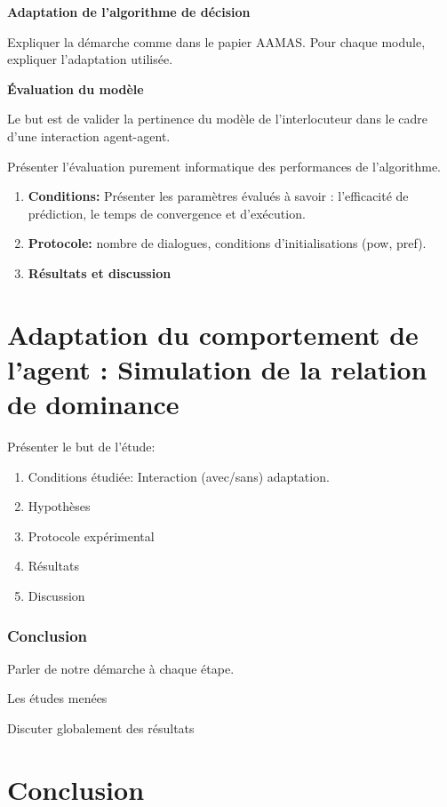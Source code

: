 \documentclass [french]{article}
\begin{document}
		\textbf{Adaptation de l'algorithme de décision}
		
			\par Expliquer la démarche comme dans le papier AAMAS. Pour chaque module, expliquer l'adaptation utilisée.
			
		\textbf{Évaluation du modèle}
		
			Le but est de valider la pertinence du modèle de l'interlocuteur dans le cadre d'une interaction agent-agent. 
			\par Présenter l'évaluation purement informatique des performances de l'algorithme.
			\begin{enumerate}
					\item \textbf{Conditions:} Présenter les paramètres évalués à savoir : l'efficacité de prédiction, le temps de convergence et d'exécution.
					\item \textbf{Protocole:} nombre de dialogues, conditions d'initialisations (pow, pref).
					\item \textbf{Résultats et discussion}
			\end{enumerate}
	
	\section{Adaptation du comportement de l'agent : Simulation de la relation de dominance}		
		
		Présenter le but de l'étude:
		
		\begin{enumerate}
			\item Conditions étudiée: Interaction (avec/sans) adaptation.
			\item Hypothèses
			\item Protocole expérimental
			\item Résultats
			\item Discussion
		\end{enumerate}
		
	\subsubsection{Conclusion}
		Parler de notre démarche à chaque étape.
		
		Les études menées
		
		Discuter globalement des résultats
	
	\section{Conclusion}
\end{document}
